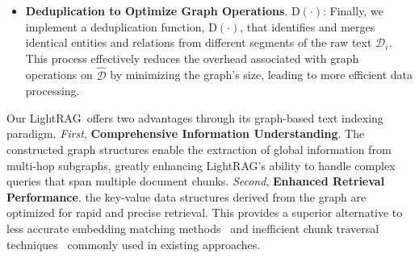 \documentclass{article} %
\def\model{LightRAG}
\begin{document}
\begin{itemize}[leftmargin=*]

    \item \textbf{Deduplication to Optimize Graph Operations}. $\text{D}(\cdot)$: Finally, we implement a deduplication function, $\text{D}(\cdot)$, that identifies and merges identical entities and relations from different segments of the raw text $\mathcal{D}_i$. This process effectively reduces the overhead associated with graph operations on $\hat{\mathcal{D}}$ by minimizing the graph's size, leading to more efficient data processing.
    
\end{itemize}

Our \model\ offers two advantages through its graph-based text indexing paradigm. \emph{First}, \textbf{Comprehensive Information Understanding}. The constructed graph structures enable the extraction of global information from multi-hop subgraphs, greatly enhancing \model's ability to handle complex queries that span multiple document chunks. \emph{Second}, \textbf{Enhanced Retrieval Performance}. the key-value data structures derived from the graph are optimized for rapid and precise retrieval. This provides a superior alternative to less accurate embedding matching methods~\citep{gao2023retrieval} and inefficient chunk traversal techniques~\citep{edge2024local} commonly used in existing approaches.


\end{document}

